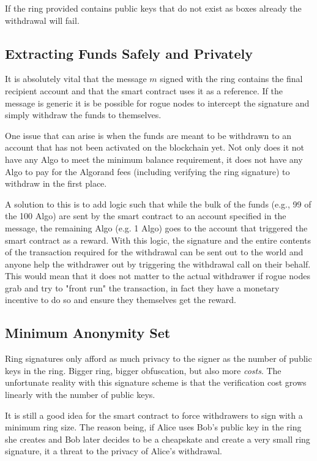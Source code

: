 \documentclass[9pt]{article}
\begin{document}
If the ring provided contains public keys that do not exist as boxes already the withdrawal will fail.

\subsection{Extracting Funds Safely and Privately}

It is absolutely vital that the message $m$ signed with the ring contains the final recipient account and that the smart contract uses it as a reference. If the message is generic it is be possible for rogue nodes to intercept the signature and simply withdraw the funds to themselves.

One issue that can arise is when the funds are meant to be withdrawn to an account that has not been activated on the blockchain yet. Not only does it not have any Algo to meet the minimum balance requirement, it does not have any Algo to pay for the Algorand fees (including verifying the ring signature) to withdraw in the first place.

A solution to this is to add logic such that while the bulk of the funds (e.g., 99 of the 100 Algo) are sent by the smart contract to an account specified in the message, the remaining Algo (e.g. 1 Algo) goes to the account that triggered the smart contract as a reward. With this logic, the signature and the entire contents of the transaction required for the withdrawal can be sent out to the world and anyone help the withdrawer out by triggering the withdrawal call on their behalf. This would mean that it does not matter to the actual withdrawer if rogue nodes grab and try to "front run" the transaction, in fact they have a monetary incentive to do so and ensure they themselves get the reward.


\subsection{Minimum Anonymity Set}

Ring signatures only afford as much privacy to the signer as the number of public keys in the ring. Bigger ring, bigger obfuscation, but also more \textit{costs}. The unfortunate reality with this signature scheme is that the verification cost grows linearly with the number of public keys.

It is still a good idea for the smart contract to force withdrawers to sign with a minimum ring size. The reason being, if Alice uses Bob's public key in the ring she creates and Bob later decides to be a cheapskate and create a very small ring signature, it a threat to the privacy of Alice's withdrawal.
\end{document}
